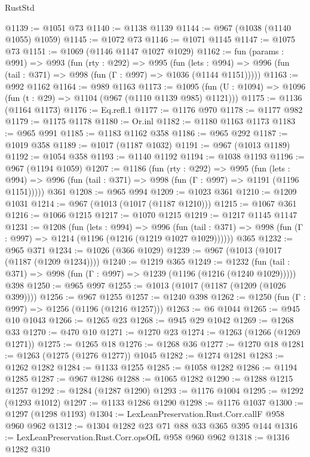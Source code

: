 \begin{lexlean}{RustStd}
\begin{coremodule}
@1139 := @1051 @73
@1140 := @1138 @1139
@1144 := @967 (@1038 (@1140 @1055) @1059)
@1145 := @1072 @73
@1146 := @1071 @1145
@1147 := @1075 @73
@1151 := @1069 (@1146 @1147 @1027 @1029)
@1162 := fun (params : @991) =>
  @993
    (fun (rty : @292) =>
    @995
      (fun (lets : @994) =>
      @996 (fun (tail : @371) => @998 (fun (Γ : @997) => @1036 (@1144 @1151)))))
@1163 := @992 @1162
@1164 := @989 @1163
@1173 := @1095 (fun (U : @1094) => @1096 (fun (t : @29) => @1104 (@967 (@1110 @1139 @985) @1121)))
@1175 := @1136 (@1164 @1173)
@1176 := Eq.refl.{1}
@1177 := @1176 @970
@1178 := @1177 @982
@1179 := @1175 @1178
@1180 := Or.inl
@1182 := @1180 @1163 @1173
@1183 := @965 @991
@1185 := @1183 @1162 @358
@1186 := @965 @292
@1187 := @1019 @358
@1189 := @1017 (@1187 @1032)
@1191 := @967 (@1013 @1189)
@1192 := @1054 @358
@1193 := @1140 @1192
@1194 := @1038 @1193
@1196 := @967 (@1194 @1059)
@1207 := @1186
    (fun (rty : @292) =>
    @995
      (fun (lets : @994) =>
      @996 (fun (tail : @371) => @998 (fun (Γ : @997) => @1191 (@1196 @1151)))))
    @361
@1208 := @965 @994
@1209 := @1023 @361
@1210 := @1209 @1031
@1214 := @967 (@1013 (@1017 (@1187 @1210)))
@1215 := @1067 @361
@1216 := @1066 @1215
@1217 := @1070 @1215
@1219 := @1217 @1145 @1147
@1231 := @1208
    (fun (lets : @994) =>
    @996 (fun (tail : @371) => @998 (fun (Γ : @997) => @1214 (@1196 (@1216 (@1219 @1027 @1029))))))
    @365
@1232 := @965 @371
@1234 := @1026 (@366 @1029)
@1239 := @967 (@1013 (@1017 (@1187 (@1209 @1234))))
@1240 := @1219 @365
@1249 := @1232
    (fun (tail : @371) => @998 (fun (Γ : @997) => @1239 (@1196 (@1216 (@1240 @1029)))))
    @398
@1250 := @965 @997
@1255 := @1013 (@1017 (@1187 (@1209 (@1026 @399))))
@1256 := @967 @1255
@1257 := @1240 @398
@1262 := @1250 (fun (Γ : @997) => @1256 (@1196 (@1216 @1257)))
@1263 := @6 @1044
@1265 := @945 @10 @1043
@1266 := @1265 @23
@1268 := @945 @29 @1042
@1269 := @1268 @33
@1270 := @470 @10
@1271 := @1270 @23
@1274 := @1263 (@1266 (@1269 @1271))
@1275 := @1265 @18
@1276 := @1268 @36
@1277 := @1270 @18
@1281 := @1263 (@1275 (@1276 @1277)) @1045
@1282 := @1274 @1281
@1283 := @1262 @1282
@1284 := @1133 @1255
@1285 := @1058 @1282
@1286 := @1194 @1285
@1287 := @967 @1286
@1288 := @1065 @1282
@1290 := @1288 @1215 @1257
@1292 := @1284 (@1287 @1290)
@1293 := @1176 @1004
@1295 := @1292 (@1293 @1012)
@1297 := @1133 @1286 @1290
@1298 := @1176 @1037
@1300 := @1297 (@1298 @1193)
@1304 := LexLeanPreservation.Rust.Corr.callF @958 @960 @962
@1312 := @1304 @1282 @23 @71 @88 @33 @365 @395 @144
@1316 := LexLeanPreservation.Rust.Corr.opsOfL @958 @960 @962
@1318 := @1316 @1282 @310

\end{coremodule}
\end{lexlean}
